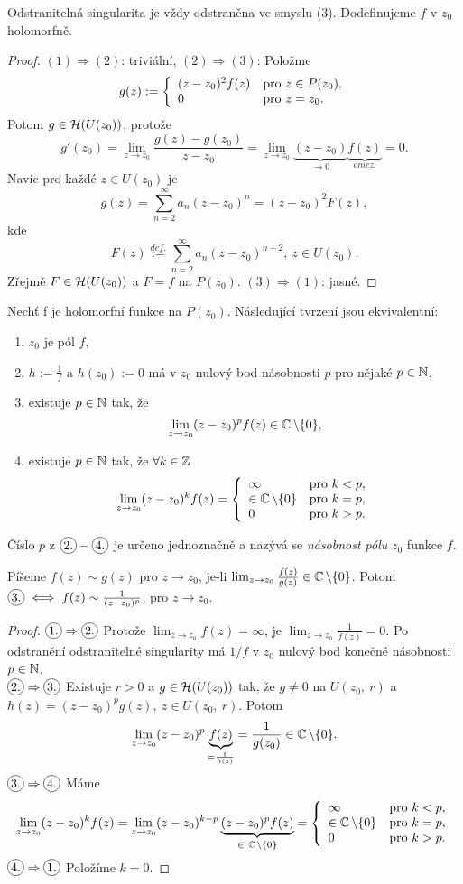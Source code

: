 \begin{agreement}
Odstranitelná singularita je vždy odstraněna ve smyslu (3). Dodefinujeme $f$ v $z_0$ holomorfně.
\end{agreement}
\begin{proof}
$(1)\Rightarrow(2)$: triviální, $(2)\Rightarrow(3)$: Položme 
$$g(z):=\left\{ \begin{array}{ll} (z-z_0)^2f(z) & \mbox{pro } z\in P(z_0), \\ 0 & \mbox{pro } z=z_0. \end{array} \right.$$ 
Potom $g\in \operatorname{\mathcal{H}}(U(z_0))$, protože 
$$g'(z_0)=\lim_{z\rightarrow z_0}\frac{g(z)-g(z_0)}{z-z_0}=\lim_{z\rightarrow z_0}\underbrace{(z-z_0)}_{\rightarrow0}\underbrace{f(z)}_{omez.}=0.$$
Navíc pro každé $z\in U(z_0)$ je 
$$g(z)=\sum_{n=2}^{\infty}a_n(z-z_0)^n=(z-z_0)^2F(z),$$ kde $$F(z)\stackrel{def.}{:=}\sum_{n=2}^{\infty}a_n(z-z_0)^{n-2},\ z\in U(z_0).$$ Zřejmě $F\in\operatorname{\mathcal{H}}(U(z_0))$ a $F=f$ na $P(z_0).$
$(3)\Rightarrow(1)$: jasné.
\end{proof}
\begin{theorem}[O pólu] Nechť f je holomorfní funkce na $P(z_0)$. Následující tvrzení jsou ekvivalentní:
\begin{enumerate}
    \item $z_0$ je pól $f$,
    \item $h:=\frac{1}{f}$ a $h(z_0):=0$ má v $z_0$ nulový bod násobnosti $p$ pro nějaké $p\in\operatorname{\mathbb{N}}$,
    \item existuje $p\in\operatorname{\mathbb{N}}$ tak, že $$\lim_{z\rightarrow z_0}(z-z_0)^pf(z)\in\operatorname{\mathbb{C}}\setminus\{0\}\text{,}$$
    \item existuje $p\in \operatorname{\mathbb{N}}$ tak, že $\forall k\in\operatorname{\mathbb{Z}}$ $$\lim_{z\rightarrow z_0}(z-z_0)^kf(z)=\left\{ \begin{array}{lll} \infty & \mbox{pro } k<p, \\ \in\operatorname{\mathbb{C}}\setminus\{0\} & \mbox{pro } k=p, \\ 0 & \mbox{pro } k>p. \end{array} \right.$$
\end{enumerate}
Číslo $p$ z $\circled{2.} - \circled{4.}$ je určeno jednoznačně a nazývá se \emph{násobnost pólu} $z_0$ funkce $f$.
\end{theorem}

\begin{note}
Píšeme $f(z)\sim g(z)$ pro $z\rightarrow z_0$, je-li $\lim_{z\rightarrow z_0}\frac{f(z)}{g(z)}\in\operatorname{\mathbb{C}}\setminus\{0\}$. Potom $\circled{3.}\iff f(z)\sim\frac{1}{(z-z_0)^p}$, pro $z\rightarrow z_0$.
\end{note} 

\begin{proof}
$\circled{1.}\Rightarrow\circled{2.}$ Protože $\lim_{z\rightarrow z_0}f(z)=\infty$, je $\lim_{z\rightarrow z_0}\frac{1}{f(z)}=0$. Po odstranění odstranitelné singularity má $1/f$ v $z_0$ nulový bod konečné násobnosti $p\in\operatorname{\mathbb{N}}$.\\
$\circled{2.}\Rightarrow\circled{3.}$ Existuje $r>0$ a $g\in\operatorname{\mathcal{H}}(U(z_0))$ tak, že $g\neq 0$ na $U(z_0,\ r)$ a $h(z)=(z-z_0)^p g(z),\ z\in U(z_0,\ r)$. Potom 
$$\lim_{z\rightarrow z_0}(z-z_0)^p\underbrace{f(z)}_{=\frac{1}{h(z)}}=\frac{1}{g(z_0)}\in\operatorname{\mathbb{C}}\setminus\{0\}.$$
$\circled{3.}\Rightarrow\circled{4.}$ Máme 
$$\lim_{z\rightarrow z_0}(z-z_0)^kf(z)=\lim_{z\rightarrow z_0}(z-z_0)^{k-p}\underbrace{(z-z_0)^pf(z)}_{\in\ \Comp\setminus\{0\}}=\threepartdef{\infty}{k<p,}{\in\Comp\setminus\{0\}}{k=p,}{0}{k>p.}$$
$\circled{4.}\Rightarrow\circled{1.}$ Položíme $k=0$.
\end{proof}

